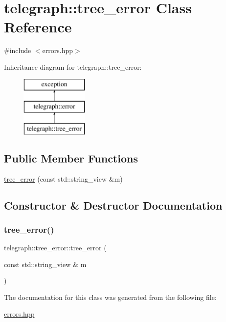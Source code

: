 \hypertarget{classtelegraph_1_1tree__error}{}\section{telegraph\+:\+:tree\+\_\+error Class Reference}
\label{classtelegraph_1_1tree__error}


{\ttfamily \#include $<$errors.\+hpp$>$}

Inheritance diagram for telegraph\+:\+:tree\+\_\+error\+:\begin{figure}[H]
\begin{center}
\leavevmode
\includegraphics[height=3.000000cm]{classtelegraph_1_1tree__error}
\end{center}
\end{figure}
\subsection*{Public Member Functions}
\begin{DoxyCompactItemize}
\item 
\hyperlink{classtelegraph_1_1tree__error_a3700c5466473f44dd2001b74ceb97305}{tree\+\_\+error} (const std\+::string\+\_\+view \&m)
\end{DoxyCompactItemize}


\subsection{Constructor \& Destructor Documentation}
\mbox{\label{classtelegraph_1_1tree__error_a3700c5466473f44dd2001b74ceb97305}} 
\subsubsection{\texorpdfstring{tree\+\_\+error()}{tree\_error()}}
{\footnotesize\ttfamily telegraph\+::tree\+\_\+error\+::tree\+\_\+error (\begin{DoxyParamCaption}\item[{const std\+::string\+\_\+view \&}]{m }\end{DoxyParamCaption})\hspace{0.3cm}{\ttfamily [inline]}}



The documentation for this class was generated from the following file\+:\begin{DoxyCompactItemize}
\item 
\hyperlink{errors_8hpp}{errors.\+hpp}\end{DoxyCompactItemize}
